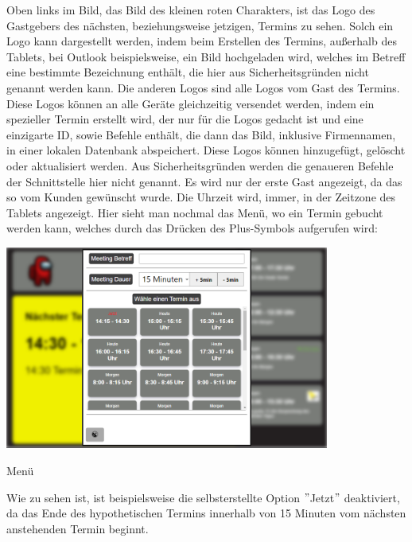 \raggedright
\newline
Oben links im Bild, das Bild des kleinen roten Charakters, ist das Logo des Gastgebers des nächsten, beziehungsweise jetzigen, Termins zu sehen.
Solch ein Logo kann dargestellt werden, indem beim Erstellen des Termins, außerhalb des Tablets, bei Outlook beispielsweise, ein Bild hochgeladen wird, welches im Betreff eine bestimmte Bezeichnung enthält, die hier aus Sicherheitsgründen nicht genannt werden kann.
\newline
Die anderen Logos sind alle Logos vom Gast des Termins.
Diese Logos können an alle Geräte gleichzeitig versendet werden, indem ein spezieller Termin erstellt wird, der nur für die Logos gedacht ist und eine einzigarte ID, sowie Befehle enthält, die dann das Bild, inklusive Firmennamen, in einer lokalen Datenbank abspeichert.
Diese Logos können hinzugefügt, gelöscht oder aktualisiert werden.
Aus Sicherheitsgründen werden die genaueren Befehle der Schnittstelle hier nicht genannt.
\newline
Es wird nur der erste Gast angezeigt, da das so vom Kunden gewünscht wurde.
\newline
Die Uhrzeit wird, immer, in der Zeitzone des Tablets angezeigt.
\newline
\newline
Hier sieht man nochmal das Menü, wo ein Termin gebucht werden kann, welches durch das Drücken des Plus-Symbols aufgerufen wird:
\par\vspace{1cm}
    \centering
    \includegraphics[width=0.8\textwidth]{Bilder/Ergebnis_TerminErstellen_Menue}
    \caption{Menü}
    \label{fig:Menue}
\par\vspace{1cm}
\raggedright
Wie zu sehen ist, ist beispielsweise die selbsterstellte Option \("\)Jetzt\("\) deaktiviert, da das Ende des hypothetischen Termins innerhalb von 15 Minuten vom nächsten anstehenden Termin beginnt.
